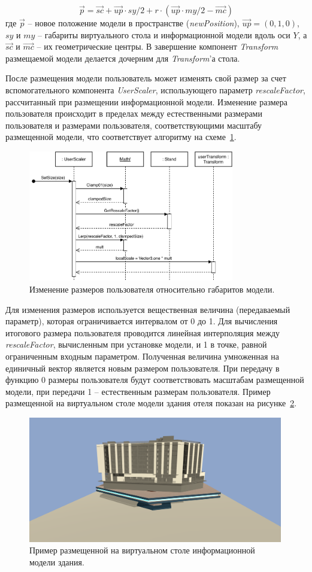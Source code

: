 \[
    \vec{p} = \vec{sc} +
    \vec{up} \cdot sy / 2 +
    r \cdot (
        \vec{up} \cdot my / 2 - \vec{mc}
    )
\]
где $\vec{p}$ -- новое положение модели в пространстве (\emph{newPosition}),
$\vec{up} = (0,1,0)$,
$sy$ и $my$ -- габариты виртуального стола и информационной модели
вдоль оси $Y$, а $\vec{sc}$ и $\vec{mc}$ -- их геометрические центры.
В завершение компонент \emph{Transform} размещаемой модели
делается дочерним для \emph{Transform}'а стола.

После размещения модели пользователь может изменять свой размер
за счет вспомогательного компонента \emph{UserScaler},
использующего параметр \emph{rescaleFactor}, рассчитанный
при размещении информационной модели. Изменение размера пользователя
происходит в пределах между естественными размерами пользователя
и размерами пользователя, соответствующими масштабу размещенной модели,
что соответствует алгоритму на схеме~\ref{figure:SSetUserSize}.

\begin{figure}[!htp]
    \centering
    \includegraphics[width=0.8\textwidth]{images/UML-SSetUserSize.pdf}
    \caption{Изменение размеров пользователя
    относительно габаритов модели.}
    \label{figure:SSetUserSize}
\end{figure}

Для изменения размеров используется вещественная величина
(передаваемый параметр), которая ограничивается интервалом от 0 до 1.
Для вычисления итогового размера пользователя
проводится линейная интерполяция между \emph{rescaleFactor},
вычисленным при установке модели, и 1 в точке, равной
ограниченным входным параметром.
Полученная величина умноженная на единичный вектор
является новым размером пользователя.
При передачу в функцию 0 размеры пользователя будут
соответствовать масштабам размещенной модели,
при передачи 1 -- естественным размерам пользователя.
Пример размещенной на виртуальном столе модели здания отеля
показан на рисунке~\ref{figure:PlacedModelExample}.

\begin{figure}[!htp]
    \centering
    \includegraphics[width=0.99\textwidth, frame]{images/PlacedModelExample.png}
    \caption{Пример размещенной на виртуальном столе
    информационной модели здания.}
    \label{figure:PlacedModelExample}
\end{figure}
